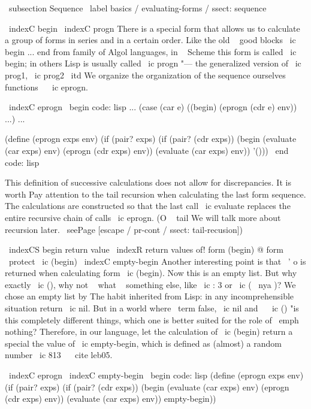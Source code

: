 {\ subsection {Sequence} \ label {basics / evaluating-forms / ssect: sequence}

\ indexC {begin} \ indexC {progn}
There is a special form that allows us to calculate a group of forms in series
and in a certain order. Like the old ~ good blocks \ ic {begin ... end} from
family of Algol languages, in ~ Scheme this form is called \ ic {begin}; in others
Lisp is usually called \ ic {progn} "--- the generalized version of \ ic {prog1},
\ ic {prog2} { \ itd } We organize the organization of the sequence ourselves
functions ~ \ ic {eprogn}.

\ indexC {eprogn}
\ begin {code: lisp}
... (case (car e)
      ((begin) (eprogn (cdr e) env)) ...) ...

(define (eprogn exps env)
  (if (pair? exps)
      (if (pair? (cdr exps))
          (begin (evaluate (car exps) env)
                 (eprogn (cdr exps) env))
          (evaluate (car exps) env))
      '()))
\ end {code: lisp}

This definition of successive calculations does not allow for discrepancies. It is worth
Pay attention to the tail recursion when calculating the last form
sequence. The calculations are constructed so that the last call \ ic {evaluate}
replaces the entire recursive chain of calls \ ic {eprogn}. (O ~ tail
We will talk more about recursion later.
\ seePage [escape / pr-cont / ssect: tail-recusion])

\ indexCS {begin} {return value}
\ indexR {return values ​​of! form (begin) @ form \ protect \ ic {(begin)}}
\ indexC {empty-begin}
Another interesting point is that \ ' {o} is returned when calculating
form \ ic {(begin)}. Now this is an empty list. But why exactly \ ic {()}, why
not ~ what ~ something else, like \ ic {: 3} or \ ic {( \ nya )}? We chose an empty list by
The habit inherited from Lisp: in any incomprehensible situation
return \ ic {nil}. But in a world where \ term {false}, \ ic {nil} and ~ \ ic {()} "is this
completely different things, which one is better suited for the role of \ emph {nothing}?
Therefore, in our language, let the calculation of \ ic {(begin)} return a special
the value of \ ic {empty-begin}, which is defined as (almost) a random number
\ ic {813} ~ \ cite {leb05}.

\ indexC {eprogn} \ indexC {empty-begin}
\ begin {code: lisp}
(define (eprogn exps env)
  (if (pair? exps)
      (if (pair? (cdr exps))
          (begin (evaluate (car exps) env)
                 (eprogn (cdr exps) env))
          (evaluate (car exps) env))
      empty-begin))

}
